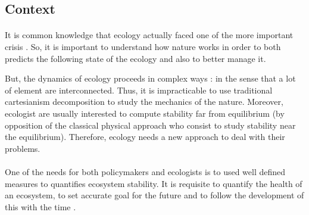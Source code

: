 \documentclass{article}
\begin{document}
\newpage


\subsection*{Context}


\paragraph{} %

It is common knowledge that ecology actually faced one of the more important crisis \cite{oosthoek_humanity_2005}. So, it is important to understand how nature works in order to both predicts the following state of the ecology and also to better manage it.

But, the dynamics of ecology proceeds in complex ways : in the sense that a lot of element are interconnected. Thus, it is impracticable to use traditional cartesianism decomposition to study the mechanics of the nature. Moreover, ecologist are usually interested to compute stability far from equilibrium (by opposition of the classical physical approach who consist to study stability near the equilibrium). %
Therefore, ecology needs a new approach to deal with their problems. 




\paragraph{} %
One of the needs for both policymakers and ecologists is to used well defined measures to quantifies ecosystem stability. It is requisite to quantify the health of an ecosystem, to set accurate goal for the future and to follow the development of this with the time \cite{donohue_navigating_2016} \cite{mayer2008strengths}. 
\end{document}
